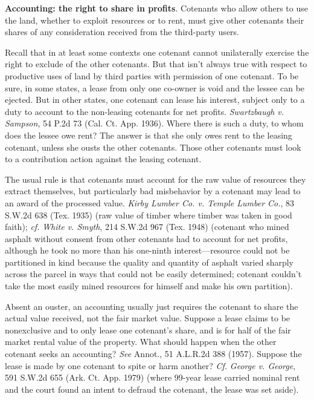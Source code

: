 \item \textbf{Accounting: the right to share in profits}. Cotenants who allow
others to use the land, whether to exploit resources or to rent, must give
other cotenants their shares of any consideration received from the third-party
users.


Recall that in at least some contexts one cotenant cannot unilaterally exercise
the right to exclude of the other cotenants. But that isn't always true with
respect to productive uses of land by third parties with permission of one
cotenant. To be sure, in some states, a lease from only one co-owner is void
and the lessee can be ejected. But in other states, one cotenant can lease his
interest, subject only to a duty to account to the non-leasing cotenants for
net profits. \emph{Swartzbaugh v. Sampson}, 54 P.2d 73 (Cal. Ct. App. 1936).
Where there is such a duty, to whom does the lessee owe rent? The answer is that
she only owes rent to the leasing cotenant, unless she ousts the other
cotenants. Those other cotenants must look to a contribution action against the
leasing cotenant.



The usual rule is that cotenants must account for the raw value of resources
they extract themselves, but particularly bad misbehavior by a cotenant may lead
to an award of the processed value. \emph{Kirby Lumber Co. v. Temple Lumber
Co.}, 83 S.W.2d 638 (Tex. 1935) (raw value of timber where timber was taken in
good faith); \emph{cf.} \emph{White v. Smyth}, 214 S.W.2d 967 (Tex. 1948)
(cotenant who mined asphalt without consent from other cotenants had to account
for net profits, although he took no more than his one-ninth interest---resource
could not be partitioned in kind because the quality and quantity of asphalt
varied sharply across the parcel in ways that could not be easily determined;
cotenant couldn't take the most easily mined resources for himself and make his
own partition).

Absent an ouster, an accounting usually just requires the cotenant to share the
actual value received, not the fair market value. Suppose a lease claims to be
nonexclusive and to only lease one cotenant's share, and is for half of the fair
market rental value of the property. What should happen when the other cotenant
seeks an accounting? \emph{See} Annot., 51 A.L.R.2d 388 (1957). Suppose the
lease is made by one cotenant to spite or harm another? \textit{Cf.}
\emph{George v. George}, 591 S.W.2d 655 (Ark. Ct. App. 1979) (where 99-year
lease carried nominal rent and the court found an intent to defraud the
cotenant, the lease was set aside).


